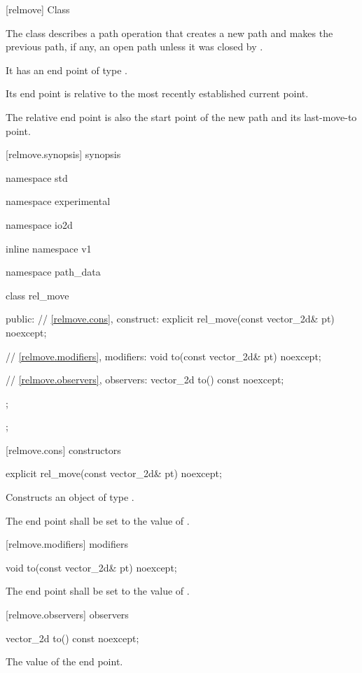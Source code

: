 [relmove] {Class }

\pnum
{}
The class  describes a path operation that creates a new path and makes the previous path, if any, an open path unless it was closed by .

\pnum
It has an end point of type .

\pnum
Its end point is relative to the most recently established current point.

\pnum
The relative end point is also the start point of the new path and its last-move-to point.

 [relmove.synopsis] { synopsis}

\begin{codeblock}
namespace std { namespace experimental { namespace io2d { inline namespace v1 {
  namespace path_data {
    class rel_move {
    public:
      // \ref{relmove.cons}, construct:
      explicit rel_move(const vector_2d& pt) noexcept;

      // \ref{relmove.modifiers}, modifiers:
      void to(const vector_2d& pt) noexcept;

      // \ref{relmove.observers}, observers:
      vector_2d to() const noexcept;
    };
  };
} } } }
\end{codeblock}

 [relmove.cons] { constructors}

\begin{itemdecl}
    explicit rel_move(const vector_2d& pt) noexcept;
\end{itemdecl}
\begin{itemdescr}
	\pnum
	\effects
	Constructs an object of type .
	
	\pnum
	The end point shall be set to the value of .
\end{itemdescr}

 [relmove.modifiers]{ modifiers}

\begin{itemdecl}
    void to(const vector_2d& pt) noexcept;
\end{itemdecl}
\begin{itemdescr}
	\pnum
	\effects
	The end point shall be set to the value of .
\end{itemdescr}

 [relmove.observers]{ observers}

\begin{itemdecl}
    vector_2d to() const noexcept;
\end{itemdecl}
\begin{itemdescr}
	\pnum
	\returns
	The value of the end point.
\end{itemdescr}
